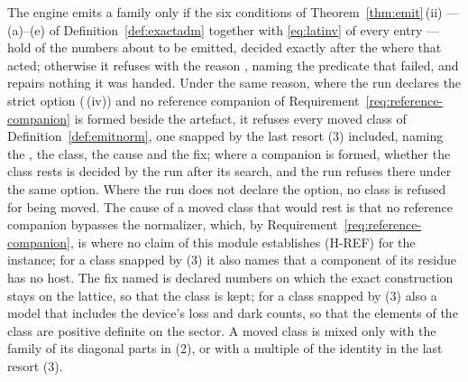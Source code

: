 \begin{requirement}\label{req:emission-refusal}
The engine emits a family only if the six conditions of
Theorem~\ref{thm:emit}\,(ii) --- (a)--(e) of
Definition~\ref{def:exactadm} together with \eqref{eq:latinv} of every entry
--- hold of the numbers about to be emitted, decided exactly after the
 where that acted; otherwise it refuses with the
reason , naming the predicate that
failed, and repairs nothing it was handed. Under the same reason, where the
run declares the strict option 
(\,(iv)) and no reference companion of
Requirement~\ref{req:reference-companion} is formed beside the artefact, it
refuses every moved class of Definition~\ref{def:emitnorm}, one snapped by
the last resort (3) included, naming the , the class, the
cause and the fix; where a companion is formed, whether the class rests is
decided by the run after its search, and the run refuses there under the
same option. Where the run does not declare the option, no class is refused
for being moved. The cause of a moved class that would rest is that no
reference companion bypasses the normalizer, which, by
Requirement~\ref{req:reference-companion}, is where no claim of this module
establishes (H-REF) for the instance; for a class snapped by (3) it also
names that a component of its residue has no host. The fix named is
declared numbers on which the exact construction stays on the lattice, so
that the class is kept; for a class
snapped by (3) also a model that includes the device's loss and dark counts,
so that the elements of the class are positive definite on the sector. A
moved class is mixed only with the family of its diagonal parts in (2), or
with a multiple of the identity in the last resort (3).
\end{requirement}
